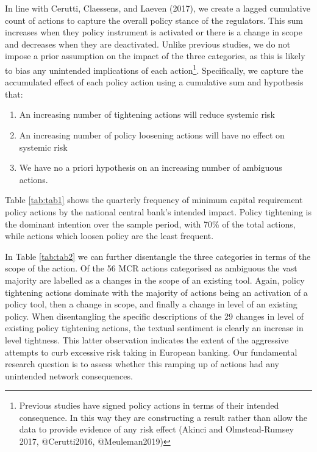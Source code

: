 \documentclass[
  10pt,
]{article}
\providecommand{\tightlist}{%
  \setlength{\itemsep}{0pt}\setlength{\parskip}{0pt}}
\begin{document}
In line with Cerutti, Claessens, and Laeven (2017), we create a lagged
cumulative count of actions to capture the overall policy stance of the
regulators. This sum increases when they policy instrument is activated
or there is a change in scope and decreases when they are deactivated.
Unlike previous studies, we do not impose a prior assumption on the
impact of the three categories, as this is likely to bias any unintended
implications of each action\footnote{Previous studies have signed policy
  actions in terms of their intended consequence. In this way they are
  constructing a result rather than allow the data to provide evidence
  of any risk effect (Akinci and Olmstead-Rumsey 2017, @Cerutti2016,
  @Meuleman2019)}. Specifically, we capture the accumulated effect of
each policy action using a cumulative sum and hypothesis that:

\begin{enumerate}
\def\labelenumi{\arabic{enumi}.}
\tightlist
\item
  An increasing number of tightening actions will reduce systemic risk
\item
  An increasing number of policy loosening actions will have no effect
  on systemic risk
\item
  We have no a priori hypothesis on an increasing number of ambiguous
  actions.
\end{enumerate}

Table \ref{tab:tab1} shows the quarterly frequency of minimum capital
requirement policy actions by the national central bank's intended
impact. Policy tightening is the dominant intention over the sample
period, with 70\% of the total actions, while actions which loosen
policy are the least frequent.

In Table \ref{tab:tab2} we can further disentangle the three categories
in terms of the scope of the action. Of the 56 MCR actions categorised
as ambiguous the vast majority are labelled as a changes in the scope of
an existing tool. Again, policy tightening actions dominate with the
majority of actions being an activation of a policy tool, then a change
in scope, and finally a change in level of an existing policy. When
disentangling the specific descriptions of the 29 changes in level of
existing policy tightening actions, the textual sentiment is clearly an
increase in level tightness. This latter observation indicates the
extent of the aggressive attempts to curb excessive risk taking in
European banking. Our fundamental research question is to assess whether
this ramping up of actions had any unintended network consequences.
\end{document}
